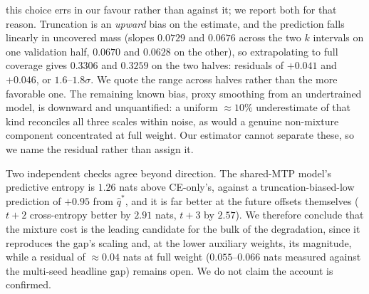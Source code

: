 this choice errs in our favour rather than against it; we report both for that
reason. Truncation is an \emph{upward} bias on the
estimate, and the prediction falls linearly in uncovered mass (slopes $0.0729$ and
$0.0676$ across the two $k$ intervals on one validation half, $0.0670$ and $0.0628$
on the other), so extrapolating to full coverage gives $0.3306$ and $0.3259$ on the
two halves: residuals of $+0.041$ and $+0.046$, or $1.6$--$1.8\sigma$. We quote the
range across halves rather than the more favorable one. The remaining known bias, proxy
smoothing from an undertrained model, is downward and unquantified: a uniform
${\approx}10\%$ underestimate of that kind reconciles all three scales within noise,
as would a genuine non-mixture component concentrated at full weight. Our estimator
cannot separate these, so we name the residual rather than assign it.

Two independent checks agree beyond direction. The shared-MTP model's predictive
entropy is $1.26$ nats above CE-only's, against a truncation-biased-low prediction of
$+0.95$ from $\hat{q}^{*}$, and it is far better at the future offsets themselves
($t{+}2$ cross-entropy better by $2.91$ nats, $t{+}3$ by $2.57$). We therefore
conclude that the mixture cost is the leading candidate for the bulk of the
degradation, since it reproduces the gap's scaling and, at the lower auxiliary
weights, its magnitude, while a residual of ${\approx}0.04$ nats at full weight
($0.055$--$0.066$ nats measured against the multi-seed headline gap) remains open. We
do not claim the account is confirmed.

